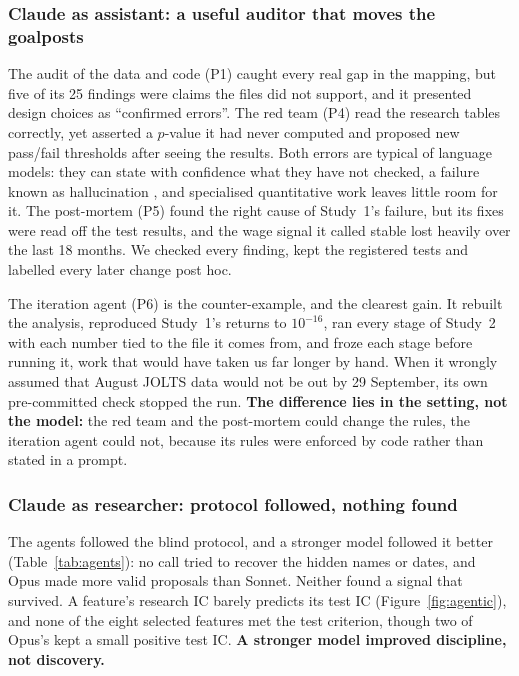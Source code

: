 \documentclass[11pt,letterpaper]{article}
\begin{document}
\subsubsection{Claude as assistant: a useful auditor that moves the goalposts}
The audit of the data and code (P1) caught every real gap in the mapping, but
five of its 25 findings were claims the files did not support, and it presented
design choices as ``confirmed errors''. The red team (P4) read the research
tables correctly, yet asserted a $p$-value it had never computed and proposed
new pass/fail thresholds after seeing the results. Both errors are typical of
language models: they can state with confidence what they have not checked, a
failure known as hallucination \citep{ji2023}, and specialised quantitative work
leaves little room for it. The post-mortem (P5) found the right cause
of Study~1's failure, but its fixes were read off the test results, and the wage
signal it called stable lost heavily over the last 18 months. We checked every
finding, kept the registered tests and labelled every later change post hoc.

The iteration agent (P6) is the counter-example, and the clearest gain. It
rebuilt the analysis, reproduced Study~1's returns to $10^{-16}$, ran every stage
of Study~2 with each number tied to the file it comes from, and froze each stage
before running it, work that would have taken us far longer by hand. When
it wrongly assumed that August JOLTS data would not be out by 29 September, its
own pre-committed check stopped the run. \textbf{The difference lies in the setting,
not the model:} the red team and the post-mortem could change the rules, the
iteration agent could not, because its rules were enforced by code rather than
stated in a prompt.

\subsubsection{Claude as researcher: protocol followed, nothing found}
The agents followed the blind protocol, and a stronger model followed it better
(Table~\ref{tab:agents}): no call tried to recover the hidden names or dates,
and Opus made more valid proposals than Sonnet. Neither found a signal
that survived. A feature's research IC barely predicts its test IC
(Figure~\ref{fig:agentic}), and none of the eight selected features met the test
criterion, though two of Opus's kept a small positive test IC. \textbf{A stronger model improved discipline, not discovery.}
\end{document}
